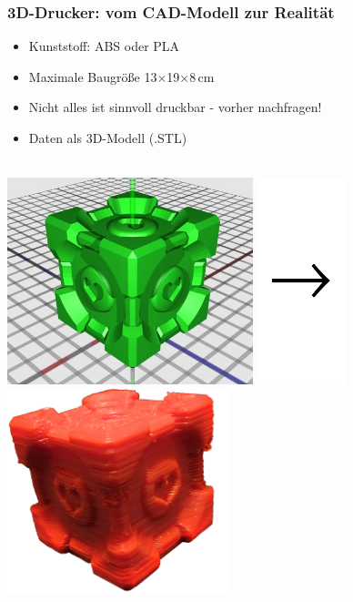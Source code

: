 \documentclass[t]{beamer}
\begin{document}
\begin{frame}
	\frametitle{3D-Drucker: vom CAD-Modell zur Realität}
	\begin{itemize}
		\item Kunststoff: ABS oder PLA
		\item Maximale Baugröße 13$\times$19$\times$8\,cm
		\item Nicht alles ist sinnvoll druckbar - vorher nachfragen!
		\item Daten als 3D-Modell (.STL)
	\end{itemize}
	\begin{center}
	~\\
		\includegraphics[height=6cm]{../img/companioncube_render.png}
		\includegraphics[height=6cm]{../img/pfeil.pdf}
		\includegraphics[height=6cm]{../img/companioncube.png}
	\end{center}
\end{frame}
\end{document}
